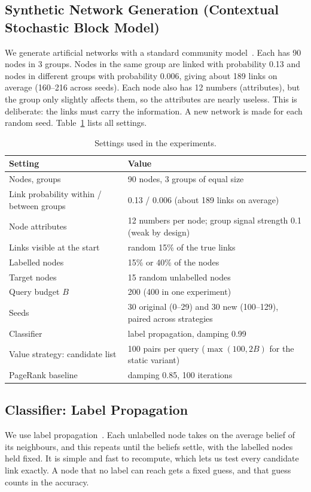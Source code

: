 \documentclass[11pt,a4paper]{article}
\begin{document}
\subsection{Synthetic Network Generation (Contextual Stochastic Block Model)}
We generate artificial networks with a standard community model~\cite{csbm}. Each has 90 nodes
in 3 groups. Nodes in the same group are linked with probability 0.13 and nodes in different
groups with probability 0.006, giving about 189 links on average (160--216 across seeds). Each node also has 12 numbers
(attributes), but the group only slightly affects them, so the attributes are nearly useless.
This is deliberate: the links must carry the information. A new network is made for each
random seed. Table~\ref{tab:settings} lists all settings.

\begin{table}[htbp]
\centering
\caption{Settings used in the experiments.}
\label{tab:settings}
\small
\begin{tabularx}{\textwidth}{>{\raggedright\arraybackslash}p{5.2cm}X}
\toprule
Setting & Value\\
\midrule
Nodes, groups & 90 nodes, 3 groups of equal size\\
Link probability within / between groups & 0.13 / 0.006 (about 189 links on average)\\
Node attributes & 12 numbers per node; group signal strength 0.1 (weak by design)\\
Links visible at the start & random 15\% of the true links\\
Labelled nodes & 15\% or 40\% of the nodes\\
Target nodes & 15 random unlabelled nodes\\
Query budget $B$ & 200 (400 in one experiment)\\
Seeds & 30 original (0--29) and 30 new (100--129), paired across strategies\\
Classifier & label propagation, damping 0.99\\
Value strategy: candidate list & 100 pairs per query ($\max(100,2B)$ for the static variant)\\
PageRank baseline & damping 0.85, 100 iterations\\
\bottomrule
\end{tabularx}
\end{table}

\subsection{Classifier: Label Propagation}
We use label propagation~\cite{zhu}. Each unlabelled node takes on the average belief of its
neighbours, and this repeats until the beliefs settle, with the labelled nodes held fixed. It
is simple and fast to recompute, which lets us test every candidate link exactly. A node that
no label can reach gets a fixed guess, and that guess counts in the accuracy.
\end{document}
